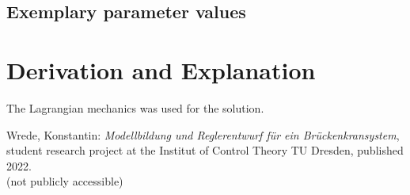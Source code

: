 \documentclass[10pt,a4paper]{article}
\begin{document}
	
	\subsection{Exemplary parameter values}
	

	
	\section{Derivation and Explanation} %
	
	The Lagrangian mechanics was used for the solution.
	
	
	\begin{thebibliography}{10}		
		Wrede, Konstantin: 
		\textit{Modellbildung und Reglerentwurf für ein Brückenkransystem}, student research project at the Institut of Control Theory TU Dresden, published 2022. \\
		(not publicly accessible)
	\end{thebibliography}
\end{document}
